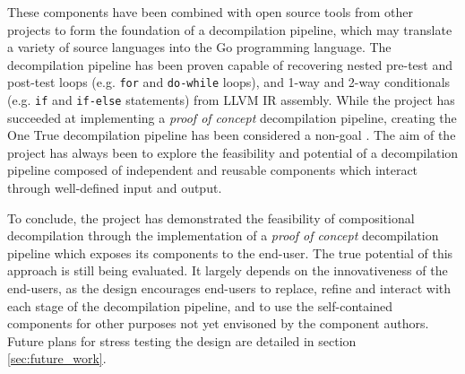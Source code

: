 These components have been combined with open source tools from other projects to form the foundation of a decompilation pipeline, which may translate a variety of source languages into the Go programming language. The decompilation pipeline has been proven capable of recovering nested pre-test and post-test loops (e.g. \texttt{for} and \texttt{do-while} loops), and 1-way and 2-way conditionals (e.g. \texttt{if} and \texttt{if-else} statements) from LLVM IR assembly. While the project has succeeded at implementing a \textit{proof of concept} decompilation pipeline, creating the One True decompilation pipeline has been considered a non-goal \cite{non-goals}. The aim of the project has always been to explore the feasibility and potential of a decompilation pipeline composed of independent and reusable components which interact through well-defined input and output.

To conclude, the project has demonstrated the feasibility of compositional decompilation through the implementation of a \textit{proof of concept} decompilation pipeline which exposes its components to the end-user. The true potential of this approach is still being evaluated. It largely depends on the innovativeness of the end-users, as the design encourages end-users to replace, refine and interact with each stage of the decompilation pipeline, and to use the self-contained components for other purposes not yet envisoned by the component authors. Future plans for stress testing the design are detailed in section \ref{sec:future_work}.
